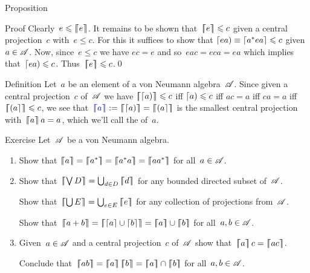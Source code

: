 \documentclass[a]{subfiles}
\begin{document}
\begin{parsec}
\begin{point}{Proposition}
\begin{point}{Proof}
Clearly~$e\leqslant \left\lceil\!\!\left\lceil e\right\rceil\!\!\right\rceil$.
It remains to be shown that~$\left\lceil\!\!\left\lceil e\right\rceil\!\!\right\rceil\leqslant c$
given a central projection~$c$ with~$e\leq c$.
For this it suffices to show that $\left\lceil ea\right)\equiv \left\lceil a^*ea\right\rceil\leqslant c$
given~$a\in\mathscr{A}$.
Now, since~$e\leq c$
we have $ec=e$
and so~$eac=eca=ea$
which implies that~$\left\lceil ea\right)\leqslant c$.
Thus~$\left\lceil\!\!\left\lceil e\right\rceil\!\!\right\rceil\leqslant c$.\qed
\end{point}
\end{point}
\begin{point}{Definition}%
Let~$a$ be an element of a von Neumann algebra~$\mathscr{A}$.
Since given a central projection~$c$ of~$\mathscr{A}$
we have
$\left\lceil\!\!\left\lceil\left\lceil a\right)\right\rceil\!\!\right\rceil\leqslant c$
iff $\left\lceil a\right)\leqslant c$
iff $ac=a$ 
iff
$ca=a$ iff $\left\lceil\!\!\left\lceil\left(a\right\rceil\right\rceil\!\!\right\rceil\leqslant c$,
we see that~$\Define{\cceil{a}}:=
\cceil{\ceill{a}}=\cceil{\ceilr{a}}$
is the smallest central projection
with~$\left\lceil\!\!\left\lceil a\right\rceil\!\!\right\rceil a=a$,
which we'll call the
 of~$a$.
\end{point}
\begin{point}{Exercise}%
Let~$\mathscr{A}$ be a von Neumann algebra.
\begin{enumerate}
\item
Show that $\cceil{a}=\cceil{a^*}
=\cceil{a^*a}=\cceil{aa^*}$
for all~$a\in\mathscr{A}$.
\item
Show that~$\cceil{ \bigvee D } = \bigcup_{d\in D} \cceil{d}$
for any bounded directed subset of~$\mathscr{A}$.

Show that~$\cceil{\bigcup E} = \bigcup_{e\in E} \cceil{e}$
for any collection of projections from~$\mathscr{A}$.

Show that~$\cceil{a+b}=\cceil{\ceil{a}\cup \ceil{b}}
=\cceil{a}\cup\cceil{b}$
for all~$a,b\in \mathscr{A}$.
\item
Given~$a\in\mathscr{A}$
and a central projection~$c$ of~$\mathscr{A}$
show that~$\cceil{a}c=\cceil{ac}$.

Conclude that~$\cceil{ab}=\cceil{a}\cceil{b}
=\cceil{a}\cap\cceil{b}$
for all~$a,b\in\mathscr{A}$.
\end{enumerate}
\end{point}
\end{parsec}
\end{document}
